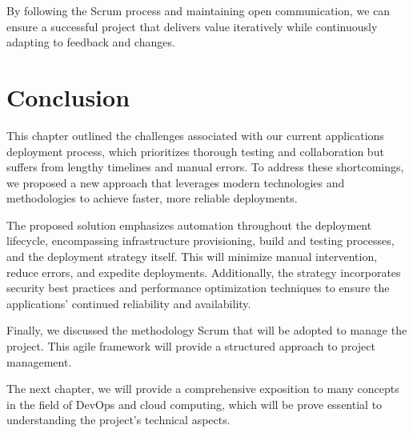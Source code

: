 By following the Scrum process and maintaining open communication, we can ensure a successful project that delivers value iteratively while continuously adapting to feedback and changes.

\section*{Conclusion}
This chapter outlined the challenges associated with our current applications deployment process, which prioritizes thorough testing and collaboration but suffers from lengthy timelines and manual errors. To address these shortcomings, we proposed a new approach that leverages modern technologies and methodologies to achieve faster, more reliable deployments.
\par
The proposed solution emphasizes automation throughout the deployment lifecycle, encompassing infrastructure provisioning, build and testing processes, and the deployment strategy itself. This will minimize manual intervention, reduce errors, and expedite deployments. Additionally, the strategy incorporates security best practices and performance optimization techniques to ensure the applications' continued reliability and availability.
\par
Finally, we discussed the methodology Scrum that will be adopted to manage the project. This agile framework will provide a structured approach to project management.
\par
The next chapter, we will provide a comprehensive exposition to many concepts in the field of DevOps and cloud computing, which will be prove essential to understanding the project's technical aspects.